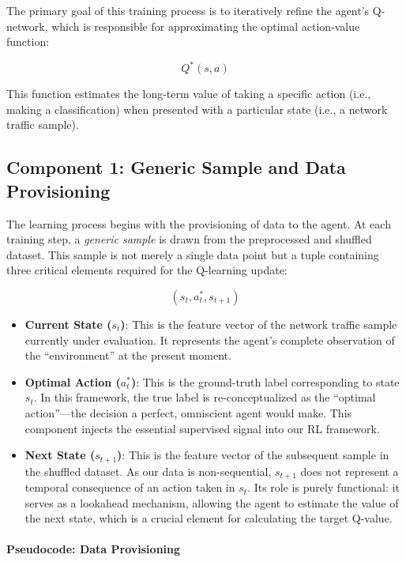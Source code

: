 \documentclass{report}
\begin{document}
The primary goal of this training process is to iteratively refine the agent's Q-network, which is responsible for approximating the optimal action-value function:

\[
Q^*(s, a)
\]

This function estimates the long-term value of taking a specific action (i.e., making a classification) when presented with a particular state (i.e., a network traffic sample).

\subsection{Component 1: Generic Sample and Data Provisioning}

The learning process begins with the provisioning of data to the agent. At each training step, a \textit{generic sample} is drawn from the preprocessed and shuffled dataset. This sample is not merely a single data point but a tuple containing three critical elements required for the Q-learning update:

\[
(s_t, a^*_t, s_{t+1})
\]

\begin{itemize}
    \item \textbf{Current State ($s_t$)}: This is the feature vector of the network traffic sample currently under evaluation. It represents the agent's complete observation of the ``environment'' at the present moment.

    \item \textbf{Optimal Action ($a^*_t$)}: This is the ground-truth label corresponding to state $s_t$. In this framework, the true label is re-conceptualized as the ``optimal action''—the decision a perfect, omniscient agent would make. This component injects the essential supervised signal into our RL framework.

    \item \textbf{Next State ($s_{t+1}$)}: This is the feature vector of the subsequent sample in the shuffled dataset. As our data is non-sequential, $s_{t+1}$ does not represent a temporal consequence of an action taken in $s_t$. Its role is purely functional: it serves as a lookahead mechanism, allowing the agent to estimate the value of the next state, which is a crucial element for calculating the target Q-value.
\end{itemize}

\paragraph{Pseudocode: Data Provisioning}
\end{document}

